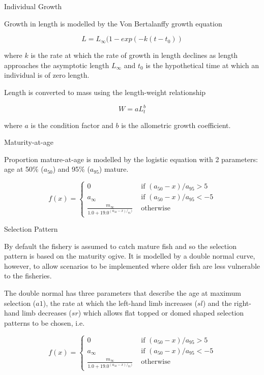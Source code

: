 \documentclass[preprint,review,12pt]{elsarticle}
\begin{document}
Individual Growth

Growth in length is modelled by the Von Bertalanffy growth equation \cite{vonbert1957quantitative}

\begin{equation} L = L_\infty(1 - exp(-k(t-t_0)) \end{equation}
         
where $k$ is the rate at which the rate of growth in length declines as length approaches the asymptotic length  $L_\infty$ and $t_{0}$ is the hypothetical time at which an individual is of zero length.

Length is converted to mass using the length-weight relationship 
    
\begin{equation} W = aL_t^b \end{equation}

\noindent where $a$ is the condition factor and $b$ is the allometric growth coefficient.


Maturity-at-age

Proportion mature-at-age is modelled by the logistic equation with 2 parameters: age at 50\% ($a_{50}$) and 95\% ($a_{95}$) mature.

\begin{equation}
f(x) = \left\{ \begin{array}{ll}
			0                                 &\mbox{ if $(a_{50}-x)/a_{95} >  5$} \\
			a_{\infty}                        &\mbox{ if $(a_{50}-x)/a_{95} < -5$} \\
			\frac{m_{\infty}}{1.0+19.0^{(a_{50}-x)/_{95})}} &\mbox{ otherwise}
		\end{array}
       \right.
\end{equation}

Selection Pattern

By default the fishery is assumed to catch mature fish and so the selection pattern is based on the maturity ogive. It is modelled by a double normal curve, however, to allow scenarios to be implemented where older fish are less vulnerable to the fisheries.    

The double normal has three parameters that describe the age at maximum selection ($a1$), the rate at which the left-hand  limb increases ($sl$) and the right-hand limb decreases ($sr$) which allows flat topped or domed shaped selection patterns to be chosen, i.e.
         
\begin{equation}
f(x) = \left\{ \begin{array}{ll}
			0                                 &\mbox{ if $(a_{50}-x)/a_{95} >  5$} \\
			a_\infty                        &\mbox{ if $(a_{50}-x)/a_{95} < -5$} \\
			\frac{m_\infty}{1.0+19.0^{(a_{50}-x)/_{95})}} &\mbox{ otherwise}
		\end{array}
       \right.
\end{equation}
\end{document}
